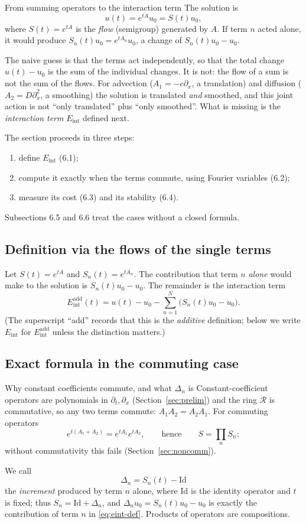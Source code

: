 \documentclass[11pt,a4paper]{article}
\theoremstyle{definition}
\newcommand{\Eint}{E_{\mathrm{int}}}
\newcommand{\ring}{\mathcal{R}}
\newcommand{\Id}{\mathrm{Id}}
\begin{document}
\begin{aside}{From summing operators to the interaction term}
The solution is
\[
u(t)=e^{tA}u_0=S(t)u_0,
\]
where $S(t)=e^{tA}$ is the \emph{flow} (semigroup) generated by $A$. If term $n$ acted alone, it would produce $S_n(t)u_0=e^{tA_n}u_0$, a change of $S_n(t)u_0-u_0$.

The naive guess is that the terms act independently, so that the total change $u(t)-u_0$ is the sum of the individual changes. It is not: the flow of a sum is not the sum of the flows. For advection ($A_1=-c\partial_x$, a translation) and diffusion ($A_2=D\partial_x^2$, a smoothing) the solution is translated \emph{and} smoothed, and this joint action is not ``only translated'' plus ``only smoothed''. What is missing is the \emph{interaction term} $\Eint$ defined next.

The section proceeds in three steps:
\begin{enumerate}[nosep]
\item define $\Eint$ (6.1);
\item compute it exactly when the terms commute, using Fourier variables (6.2);
\item measure its cost (6.3) and its stability (6.4).
\end{enumerate}
Subsections 6.5 and 6.6 treat the cases without a closed formula.
\end{aside}

\subsection{Definition via the flows of the single terms}
Let $S(t)=e^{tA}$ and $S_n(t)=e^{tA_n}$. The contribution that term $n$ \emph{alone} would make to the solution is $S_n(t)u_0-u_0$. The remainder is the interaction term
\begin{equation}\label{eq:eint-def}
\Eint^{\mathrm{add}}(t)=u(t)-u_0-\sum_{n=1}^N\big(S_n(t)u_0-u_0\big).
\end{equation}
(The superscript ``add'' records that this is the \emph{additive} definition; below we write $\Eint$ for $\Eint^{\mathrm{add}}$ unless the distinction matters.)

\subsection{Exact formula in the commuting case}
\begin{aside}{Why constant coefficients commute, and what $\Delta_n$ is}
Constant-coefficient operators are polynomials in $\partial_t,\partial_x$ (Section~\ref{sec:prelim}) and the ring $\ring$ is commutative, so any two terms commute: $A_1A_2=A_2A_1$. For commuting operators
\[
e^{t(A_1+A_2)}=e^{tA_1}e^{tA_2},\qquad\text{hence}\qquad S=\prod_nS_n;
\]
without commutativity this fails (Section~\ref{sec:noncomm}).

We call
\[
\Delta_n=S_n(t)-\Id
\]
the \emph{increment} produced by term $n$ alone, where $\Id$ is the identity operator and $t$ is fixed; thus $S_n=\Id+\Delta_n$, and $\Delta_nu_0=S_n(t)u_0-u_0$ is exactly the contribution of term $n$ in \eqref{eq:eint-def}. Products of operators are compositions.
\end{aside}
\end{document}

